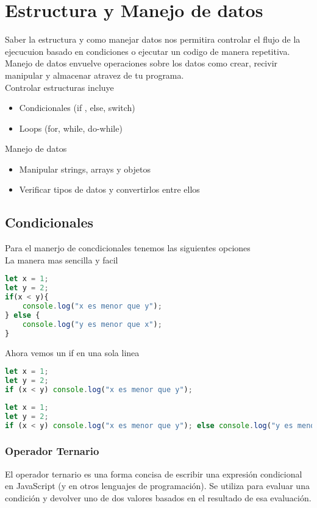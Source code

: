 \chapter{Estructura y Manejo de datos}
Saber la estructura y como manejar datos nos permitira controlar el flujo de la ejecucuion basado en condiciones o ejecutar un codigo de manera repetitiva. Manejo de datos envuelve operaciones sobre los datos como crear, recivir manipular y almacenar atravez de tu programa.
\\
Controlar estructuras incluye
\begin{itemize}
  \item Condicionales (if , else, switch)
  \item Loops (for, while, do-while)
\end{itemize}
Manejo de datos
\begin{itemize}
  \item Manipular strings, arrays y objetos
  \item Verificar tipos de datos y convertirlos entre ellos
\end{itemize}

\section{Condicionales}
Para el manerjo de concdicionales tenemos las siguientes opciones
\\
La manera mas sencilla y facil

\begin{lstlisting}[language=JavaScript,caption={Ejemplo if else basico}]
let x = 1;
let y = 2;
if(x < y){
    console.log("x es menor que y");
} else {
    console.log("y es menor que x");
}
\end{lstlisting}
Ahora vemos un if en una sola linea

\begin{lstlisting}[language=JavaScript,caption={Ejemplo if una linea}]
let x = 1;
let y = 2;
if (x < y) console.log("x es menor que y");
\end{lstlisting}

\begin{lstlisting}[language=JavaScript,caption={Ejemplo if else una linea}]
let x = 1;
let y = 2;
if (x < y) console.log("x es menor que y"); else console.log("y es menor que x");
\end{lstlisting}
\subsection{Operador Ternario}
El operador ternario es una forma concisa de escribir una expresión condicional en JavaScript (y en otros lenguajes de programación). Se utiliza para evaluar una condición y devolver uno de dos valores basados en el resultado de esa evaluación. \cite{OpenAI2023}
\\

